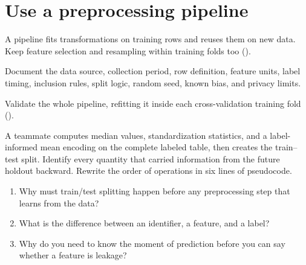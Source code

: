 \section{Use a preprocessing pipeline}
\label{sec:preprocessing-pipeline}

A pipeline fits transformations on training rows and reuses them on new data. Keep feature selection and resampling within training folds too ().

\begin{mlfigure}
\end{mlfigure}

Document the data source, collection period, row definition, feature units, label timing, inclusion rules, split logic, random seed, known bias, and privacy limits.

\begin{keyidea}
Validate the whole pipeline, refitting it inside each cross-validation training fold ().
\end{keyidea}

\begin{debugtask}
A teammate computes median values, standardization statistics, and a label-informed mean encoding on the complete labeled table, then creates the train--test split. Identify every quantity that carried information from the future holdout backward. Rewrite the order of operations in six lines of pseudocode.
\end{debugtask}



\begin{quickcheck}
\begin{enumerate}
  \item Why must train/test splitting happen before any preprocessing step that learns from the data?
  \item What is the difference between an identifier, a feature, and a label?
  \item Why do you need to know the moment of prediction before you can say whether a feature is leakage?
\end{enumerate}
\end{quickcheck}

